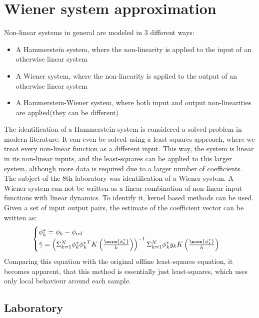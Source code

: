 \chapter{Wiener system approximation}
Non-linear systems in general are modeled in 3 different ways:
\begin{itemize}
        \item A Hammerstein system, where the non-linearity is applied to the input of an otherwise linear system
        \item A Wiener system, where the non-linearity is applied to the output of an otherwise linear system
        \item A Hammerstein-Wiener system, where both input and output non-linearities are applied(they can be different)
\end{itemize}

The identification of a Hammerstein system is considered a solved problem in modern literature.
It can even be solved using a least squares approach, where we treat every non-linear function as a different input. 
This way, the system is linear in its non-linear inputs, and the least-squares can be applied to this larger system, although
more data is required due to a larger number of coefficients.\\
The subject of the 8th laboratory was identification of a Wiener system. A Wiener system can not be written as a linear combination
of non-linear input functions with linear dynamics. To identify it, kernel based methods can be used. Given a set of input output pairs,
the estimate of the coefficient vector can be written as:
\begin{equation}
    \begin{cases}
        
        \phi_k^{*} = \phi_k - \phi_{\text{ref}}\\
        \hat{\gamma} = \left(\Sigma_{k=1}^{N}\phi_k^{*}{\phi_k^{*}}^{T}K\left(\frac{\norm{\phi_k^{*}}}{h}\right)\right)^{-1}\Sigma^{N}_{k=1}\phi^{*}_ky_k K\left(\frac{\norm{\phi_k^{*}}}{h}\right)
    \end{cases}
\end{equation}
Comparing this equation with the original offline least-squares equation, it becomes apparent, that this method is essentially just least-squares, which uses only local behaviour around each sample.

\section{Laboratory}

